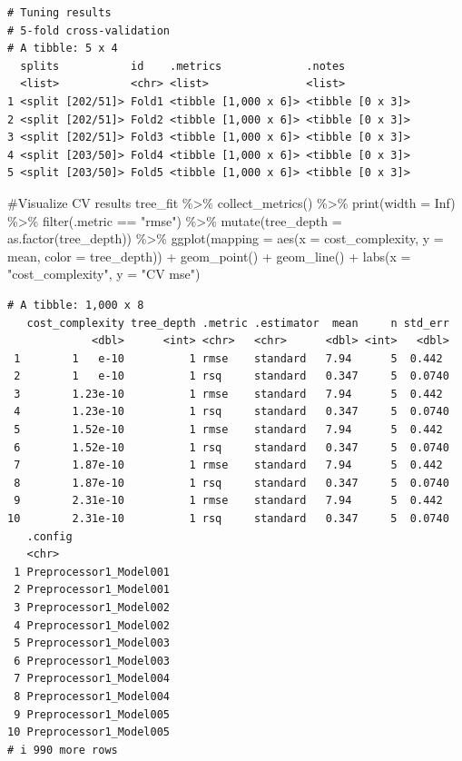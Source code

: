 \documentclass[
]{article}
\newenvironment{Shaded}{\begin{snugshade}}{\end{snugshade}}
\newcommand{\AttributeTok}[1]{\textcolor[rgb]{0.40,0.45,0.13}{#1}}
\newcommand{\CommentTok}[1]{\textcolor[rgb]{0.37,0.37,0.37}{#1}}
\newcommand{\ConstantTok}[1]{\textcolor[rgb]{0.56,0.35,0.01}{#1}}
\newcommand{\FunctionTok}[1]{\textcolor[rgb]{0.28,0.35,0.67}{#1}}
\newcommand{\NormalTok}[1]{\textcolor[rgb]{0.00,0.23,0.31}{#1}}
\newcommand{\SpecialCharTok}[1]{\textcolor[rgb]{0.37,0.37,0.37}{#1}}
\newcommand{\StringTok}[1]{\textcolor[rgb]{0.13,0.47,0.30}{#1}}
\begin{document}
\begin{verbatim}
# Tuning results
# 5-fold cross-validation 
# A tibble: 5 x 4
  splits           id    .metrics             .notes          
  <list>           <chr> <list>               <list>          
1 <split [202/51]> Fold1 <tibble [1,000 x 6]> <tibble [0 x 3]>
2 <split [202/51]> Fold2 <tibble [1,000 x 6]> <tibble [0 x 3]>
3 <split [202/51]> Fold3 <tibble [1,000 x 6]> <tibble [0 x 3]>
4 <split [203/50]> Fold4 <tibble [1,000 x 6]> <tibble [0 x 3]>
5 <split [203/50]> Fold5 <tibble [1,000 x 6]> <tibble [0 x 3]>
\end{verbatim}

\begin{Shaded}
\begin{Highlighting}[]
\CommentTok{\#Visualize CV results}
\NormalTok{tree\_fit }\SpecialCharTok{\%\textgreater{}\%}
  \FunctionTok{collect\_metrics}\NormalTok{() }\SpecialCharTok{\%\textgreater{}\%}
  \FunctionTok{print}\NormalTok{(}\AttributeTok{width =} \ConstantTok{Inf}\NormalTok{) }\SpecialCharTok{\%\textgreater{}\%}
  \FunctionTok{filter}\NormalTok{(.metric }\SpecialCharTok{==} \StringTok{"rmse"}\NormalTok{) }\SpecialCharTok{\%\textgreater{}\%}
  \FunctionTok{mutate}\NormalTok{(}\AttributeTok{tree\_depth =} \FunctionTok{as.factor}\NormalTok{(tree\_depth)) }\SpecialCharTok{\%\textgreater{}\%}
  \FunctionTok{ggplot}\NormalTok{(}\AttributeTok{mapping =} \FunctionTok{aes}\NormalTok{(}\AttributeTok{x =}\NormalTok{ cost\_complexity, }\AttributeTok{y =}\NormalTok{ mean, }\AttributeTok{color =}\NormalTok{ tree\_depth)) }\SpecialCharTok{+}
  \FunctionTok{geom\_point}\NormalTok{() }\SpecialCharTok{+} 
  \FunctionTok{geom\_line}\NormalTok{() }\SpecialCharTok{+} 
  \FunctionTok{labs}\NormalTok{(}\AttributeTok{x =} \StringTok{"cost\_complexity"}\NormalTok{, }\AttributeTok{y =} \StringTok{"CV mse"}\NormalTok{)}
\end{Highlighting}
\end{Shaded}

\begin{verbatim}
# A tibble: 1,000 x 8
   cost_complexity tree_depth .metric .estimator  mean     n std_err
             <dbl>      <int> <chr>   <chr>      <dbl> <int>   <dbl>
 1        1   e-10          1 rmse    standard   7.94      5  0.442 
 2        1   e-10          1 rsq     standard   0.347     5  0.0740
 3        1.23e-10          1 rmse    standard   7.94      5  0.442 
 4        1.23e-10          1 rsq     standard   0.347     5  0.0740
 5        1.52e-10          1 rmse    standard   7.94      5  0.442 
 6        1.52e-10          1 rsq     standard   0.347     5  0.0740
 7        1.87e-10          1 rmse    standard   7.94      5  0.442 
 8        1.87e-10          1 rsq     standard   0.347     5  0.0740
 9        2.31e-10          1 rmse    standard   7.94      5  0.442 
10        2.31e-10          1 rsq     standard   0.347     5  0.0740
   .config               
   <chr>                 
 1 Preprocessor1_Model001
 2 Preprocessor1_Model001
 3 Preprocessor1_Model002
 4 Preprocessor1_Model002
 5 Preprocessor1_Model003
 6 Preprocessor1_Model003
 7 Preprocessor1_Model004
 8 Preprocessor1_Model004
 9 Preprocessor1_Model005
10 Preprocessor1_Model005
# i 990 more rows
\end{verbatim}
\end{document}
